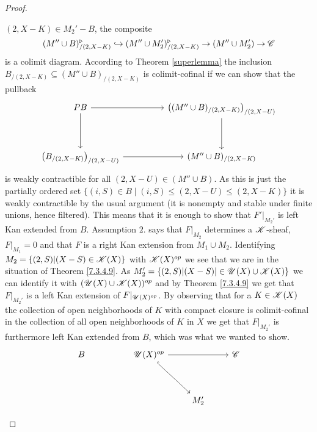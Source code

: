 \documentclass[../../thesis.tex]{subfiles}
\begin{document}
\begin{proof}
\begin{enumerate}[label=(\alph*)]
              $(2,X-K)\in M_2' - B$, the composite
              \[
                  (M'' \cup B)^{\triangleright}_{/(2,X-K)} \hookrightarrow  (M'' \cup M_2')^{\triangleright}_{/(2,X-K)} \to (M''\cup M_2') \to \mathscr{C}
              \]
              is a colimit diagram.
              According to Theorem \ref{superlemma} the inclusion $B_{/(2,X-K)}\subseteq (M''\cup B)_{/(2,X-K)}$ is colimit-cofinal if we can show that the pullback
              \[\begin{tikzcd}
                      PB && {\left((M''\cup B)_{/(2,X-K)}\right)_{/(2,X-U)}} \\
                      \\
                      {\left(B_{/(2,X-K)}\right)_{/(2,X-U)}} && {(M''\cup B)_{/(2,X-K)}}
                      \arrow[from=1-1, to=1-3]
                      \arrow[from=1-3, to=3-3]
                      \arrow[from=3-1, to=3-3]
                      \arrow[from=1-1, to=3-1]
                  \end{tikzcd}\]
              is weakly contractible for all $(2,X-U) \in (M''\cup B)$.
              As this is just the partially ordered set $\{(i,S)\in B \mid (i,S) \leq (2,X-U) \leq (2,X-K)\}$ it is weakly contractible by the usual argument (it is nonempty and stable under finite unions, hence filtered).
              This means that it is enough to show that $F'|_{M_2'}$ is left Kan extended from $B$.
              Assumption $2.$ says that $F|_{M_2}$ determines a $\mathscr{K}$-sheaf, $F|_{M_1}=0$ and that $F$ is a right Kan extension from $M_1 \cup M_2$.
              Identifying $M_2 = \{(2, S) | (X-S) \in \mathscr{K}(X)\}$ with $\mathscr{K}(X)^{op}$ we see that we are in the situation of Theorem \ref{7.3.4.9}.
              As $M_2' = \{(2,S) | (X-S) | \in \mathscr{U}(X) \cup \mathscr{K}(X)\}$ we can identify it with $(\mathscr{U}(X) \cup \mathscr{K}(X))^{op}$ and by Theorem \ref{7.3.4.9} we get that $F|_{M_2'}$ is a left Kan extension of $F|_{\mathscr{U}(X)^{op}}$.
              By observing that for a $K \in \mathscr{K}(X)$ the collection of open neighborhoods of $K$ with compact closure is colimit-cofinal in the collection of all open neighborhoods of $K$ in $X$ we get that $F|_{M_2'}$ is furthermore left Kan extended from $B$, which was what we wanted to show.
              \[\begin{tikzcd}
                      B && {\Open(X)^{op}} && \C \\
                      \\
                      &&& {M_2'}
                      \arrow[hook, from=1-3, to=3-4]
                      \arrow[from=1-3, to=1-5]

\end{tikzcd}\]
\end{enumerate}
\end{proof}
\end{document}
